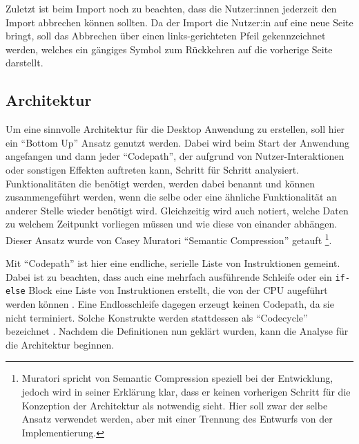 Zuletzt ist beim Import noch zu beachten, dass die Nutzer:innen jederzeit den Import abbrechen können sollten.
Da der Import die Nutzer:in auf eine neue Seite bringt, soll das Abbrechen über einen links-gerichteten Pfeil gekennzeichnet werden, welches ein gängiges Symbol zum Rückkehren auf die vorherige Seite darstellt. %


\subsection{Architektur} \label{vorgehenSW-UI-code}

Um eine sinnvolle Architektur für die Desktop Anwendung zu erstellen, soll hier ein \enquote{Bottom Up} Ansatz genutzt werden.
Dabei wird beim Start der Anwendung angefangen und dann jeder \enquote{Codepath}, der aufgrund von Nutzer-Interaktionen oder sonstigen Effekten auftreten kann, Schritt für Schritt analysiert.
Funktionalitäten die benötigt werden, werden dabei benannt und können zusammengeführt werden, wenn die selbe oder eine ähnliche Funktionalität an anderer Stelle wieder benötigt wird.
Gleichzeitig wird auch notiert, welche Daten zu welchem Zeitpunkt vorliegen müssen und wie diese von einander abhängen. \newline
Dieser Ansatz wurde von Casey Muratori \enquote{Semantic Compression} getauft \cite[vgl.][]{mur.SemanticCompression.14}\footnote{Muratori spricht von Semantic Compression speziell bei der Entwicklung, jedoch wird in seiner Erklärung klar, dass er keinen vorherigen Schritt für die Konzeption der Architektur als notwendig sieht. Hier soll zwar der selbe Ansatz verwendet werden, aber mit einer Trennung des Entwurfs von der Implementierung.}.

Mit \enquote{Codepath} ist hier eine endliche, serielle Liste von Instruktionen gemeint.
Dabei ist zu beachten, dass auch eine mehrfach ausführende Schleife oder ein \lstinline|if-else| Block eine Liste von Instruktionen erstellt, die von der CPU augeführt werden können \cite[vgl.][]{fle.TaxonomyComputationShapes.23}. \newline
Eine Endlosschleife dagegen erzeugt keinen Codepath, da sie nicht terminiert.
Solche Konstrukte werden stattdessen als \enquote{Codecycle} bezeichnet \cite[vgl.][]{fle.TaxonomyComputationShapes.23}.
Nachdem die Definitionen nun geklärt wurden, kann die Analyse für die Architektur beginnen.

